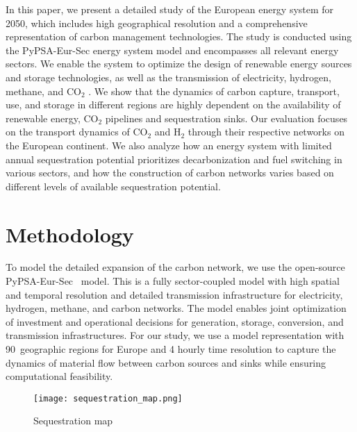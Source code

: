 \documentclass[conference]{IEEEtran}
\newcommand{\carbon}{CO$_2$ }
\newcommand{\hydrogen}{H$_2$ }
\begin{document}
In this paper, we present a detailed study of the European energy system for 2050, which includes high geographical resolution and a comprehensive representation of carbon management technologies. The study is conducted using the PyPSA-Eur-Sec energy system model and encompasses all relevant energy sectors. We enable the system to optimize the design of renewable energy sources and storage technologies, as well as the transmission of electricity, hydrogen, methane, and \carbon. We show that the dynamics of carbon capture, transport, use, and storage in different regions are highly dependent on the availability of renewable energy, \carbon pipelines and sequestration sinks. Our evaluation focuses on the transport dynamics of \carbon and \hydrogen through their respective networks on the European continent. We also analyze how an energy system with limited annual sequestration potential prioritizes decarbonization and fuel switching in various sectors, and how the construction of carbon networks varies based on different levels of available sequestration potential.


\section{Methodology}
\label{sec:methodology}

To model the detailed expansion of the carbon network, we use the open-source PyPSA-Eur-Sec~\cite{PyPSAEurSecSectorCoupledOpen2023} model. This is a fully sector-coupled model with high spatial and temporal resolution and detailed transmission infrastructure for electricity, hydrogen, methane, and carbon networks. The model enables joint optimization of investment and operational decisions for generation, storage, conversion, and transmission infrastructures. For our study, we use a model representation with 90~geographic regions for Europe and 4 hourly time resolution to capture the dynamics of material flow between carbon sources and sinks while ensuring computational feasibility.

\begin{figure}
    \centering
    \texttt{[image: sequestration\_map.png]}
    \caption{Sequestration map}
    \label{fig:sequestration_map}
\end{figure}
\end{document}
